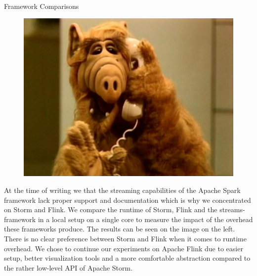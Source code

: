 \begin{multicols}{2}
    \begin{block}[]{Framework Comparisons}%
      \begin{multicols}{2}
        \begin{figure}
          \includegraphics[width=\linewidth]{images/alf.jpg}\\
        \end{figure}
        \columnbreak
        At the time of writing we that the streaming capabilities of the Apache Spark framework lack proper support and documentation
        which is why we concentrated on Storm and Flink. We compare the runtime of Storm, Flink and the streams-framework in a local setup on a single
        core to measure the impact of the overhead these frameworks produce. The results can be seen on the image on the left.
        There is no clear preference between Storm and Flink when it comes to runtime overhead. We chose to continue our experiments on
        Apache Flink due to easier setup, better visualization tools and a more comfortable abstraction compared to the rather low-level
        API of Apache Storm.
      \end{multicols}
    \end{block}%


\end{multicols}
